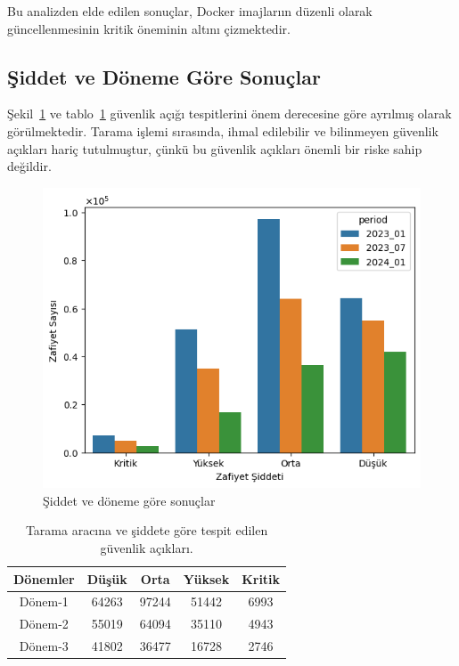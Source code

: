 Bu analizden elde edilen sonuçlar, Docker imajlarıın düzenli olarak güncellenmesinin kritik öneminin altını çizmektedir.

\subsection{Şiddet ve Döneme Göre Sonuçlar}\label{subsec:results-severity-and-period}

Şekil~\ref{fig:vuln-severity-period-1} ve tablo~\ref{tab:vuln-severity-period-1} güvenlik açığı tespitlerini önem derecesine göre ayrılmış olarak görülmektedir. Tarama işlemi sırasında, ihmal edilebilir ve bilinmeyen güvenlik açıkları hariç tutulmuştur, çünkü bu güvenlik açıkları önemli bir riske sahip değildir.

\begin{figure}
    \centering
    \includegraphics[width=1\linewidth]{images/s2/vuln-severity-period-1.png}
    \caption{Şiddet ve döneme göre sonuçlar}\label{fig:vuln-severity-period-1}
\end{figure}

\begin{table}
    \caption{Tarama aracına ve şiddete göre tespit edilen güvenlik açıkları.}\label{tab:vuln-severity-period-1}
    \centering
    \begin{tabular}{ |c|c|c|c|c| }
        \hline
        Dönemler & Düşük & Orta & Yüksek & Kritik \\
        \hline
        Dönem-1 & 64263 & 97244 & 51442 & 6993 \\
        Dönem-2 & 55019 & 64094 & 35110 & 4943 \\
        Dönem-3 & 41802 & 36477 & 16728 & 2746 \\
        \hline
    \end{tabular}
\end{table}

